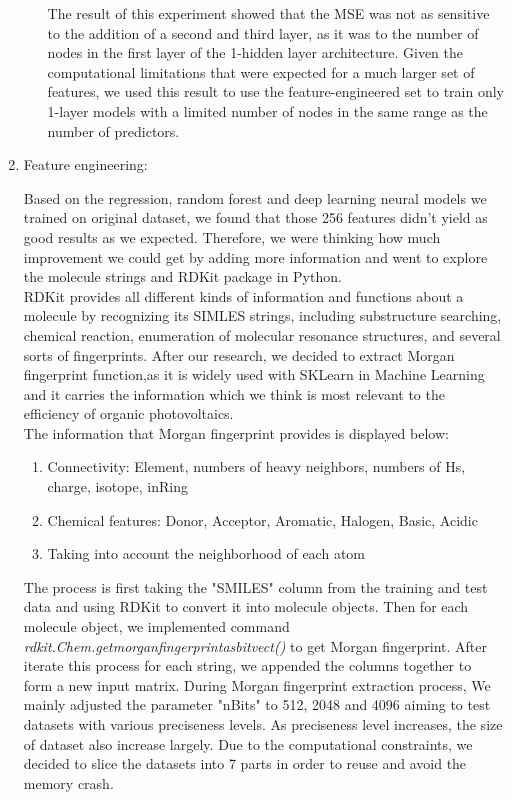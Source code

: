\documentclass[11pt]{article}
\begin{document}
\begin{enumerate}
\begin{enumerate}
The result of this experiment showed that the MSE was not as sensitive to the addition of a second and third layer, as it was to the number of nodes in the first layer of the 1-hidden layer architecture. Given the computational limitations that were expected for a much larger set of features, we used this result to use the feature-engineered set to train only 1-layer models with a limited number of nodes in the same range as the number of predictors. \\


\end{enumerate}
\item Feature engineering: 

Based on the regression, random forest and deep learning neural models we trained on original dataset, we found that those 256 features didn't yield as good results as we expected. Therefore, we were thinking how much improvement we could get by adding more information and went to explore the molecule strings and RDKit package in Python. \\

RDKit provides all different kinds of information and functions about a molecule by recognizing its SIMLES strings, including substructure searching, chemical reaction, enumeration of molecular resonance structures, and several sorts of fingerprints. After our research, we decided to extract Morgan fingerprint function,as it is widely used with SKLearn in Machine Learning and it carries the information which we think is most relevant to the efficiency of organic photovoltaics. \\ 

The information that Morgan fingerprint provides is displayed below:
\begin{enumerate}
\item Connectivity: Element, numbers of heavy neighbors, numbers of Hs, charge, isotope, inRing
\item Chemical features: Donor, Acceptor, Aromatic, Halogen, Basic, Acidic
\item Taking into account the neighborhood of each atom\\
\end{enumerate}
The process is first taking the "SMILES" column from the training and test data and using RDKit to convert it into molecule objects. Then for each molecule object, we implemented command {\itshape rdkit.Chem.getmorganfingerprintasbitvect()} to get Morgan fingerprint. After iterate this process for each string, we appended the columns together to form a new input matrix. During Morgan fingerprint extraction process, We mainly adjusted the parameter "nBits" to 512, 2048 and 4096 aiming to test datasets with various preciseness levels. As preciseness level increases, the size of dataset also increase largely. Due to the computational constraints, we decided to slice the datasets into 7 parts in order to reuse and avoid the memory crash. \\

\end{enumerate}
\end{document}
